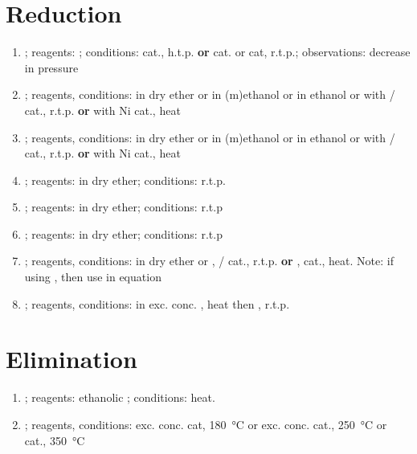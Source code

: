 \section{Reduction}
\begin{enumerate}
    \item {}; reagents: ; conditions:  cat., h.t.p. \textbf{or}  cat. or  cat, r.t.p.; observations: decrease in pressure
    \item {}; reagents, conditions:  in dry ether or  in (m)ethanol or  in ethanol or  with / cat., r.t.p. \textbf{or}  with {Ni} cat., heat
    \item {}; reagents, conditions:  in dry ether or  in (m)ethanol or  in ethanol or  with / cat., r.t.p. \textbf{or}  with {Ni} cat., heat
    \item {}; reagents:  in dry ether; conditions: r.t.p.
    \item {}; reagents:  in dry ether; conditions: r.t.p
    \item {}; reagents:  in dry ether; conditions: r.t.p
    \item {}; reagents, conditions:  in dry ether or , / cat., r.t.p. \textbf{or} ,  cat., heat. Note: if using , then use  in equation
    \item {}; reagents, conditions:  in exc. conc. , heat then , r.t.p.
\end{enumerate}
\section{Elimination}
\begin{enumerate}
    \item {}; reagents: ethanolic ; conditions: heat.
    \item {}; reagents, conditions: exc. conc.  cat, \SI{180}{\celsius} or exc. conc.  cat., \SI{250}{\celsius} or  cat., \SI{350}{\celsius}
\end{enumerate}
